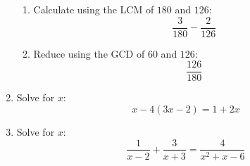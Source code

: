 \documentclass[letterpaper,12pt,fleqn]{article}
\begin{document}
\begin{enumerate}
\begin{enumerate}
  \item Calculate using the LCM of $180$ and $126$:
    \[\frac{3}{180}-\frac{2}{126}\]

    \vspace{2in}
    
  \item Reduce using the GCD of $60$ and $126$:
    \[\frac{126}{180}\]
  \end{enumerate}

  \newpage

\item Solve for $x$:
  \[x-4(3x-2)=1+2x\]

  \vspace{3in}

\item Solve for $x$:
  \[\frac{1}{x-2}+\frac{3}{x+3}=\frac{4}{x^2+x-6}\]

\end{enumerate}
\end{document}
